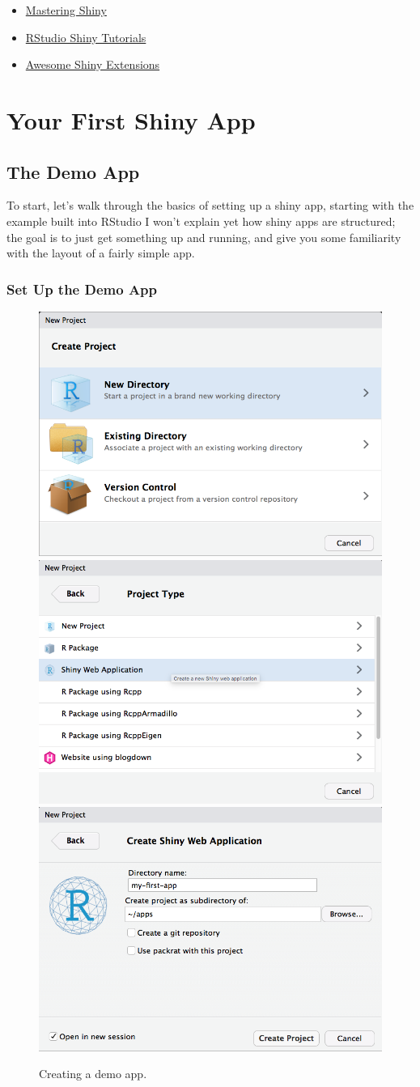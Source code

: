 \documentclass[
]{book}
\providecommand{\tightlist}{%
  \setlength{\itemsep}{0pt}\setlength{\parskip}{0pt}}
\begin{document}
\begin{itemize}
\tightlist
\item
  \href{https://mastering-shiny.org/}{Mastering Shiny}
\item
  \href{https://shiny.rstudio.com/tutorial/}{RStudio Shiny Tutorials}
\item
  \href{https://github.com/nanxstats/awesome-shiny-extensions}{Awesome Shiny Extensions}
\end{itemize}

\hypertarget{first-app}{%
\chapter{Your First Shiny App}\label{first-app}}

\hypertarget{the-demo-app}{%
\section{The Demo App}\label{the-demo-app}}

To start, let's walk through the basics of setting up a shiny app, starting with the example built into RStudio I won't explain yet how shiny apps are structured; the goal is to just get something up and running, and give you some familiarity with the layout of a fairly simple app.

\hypertarget{set-up-the-demo-app}{%
\subsection{Set Up the Demo App}\label{set-up-the-demo-app}}

\begin{figure}

{\centering \includegraphics[width=0.3\linewidth]{images/demo_app/01-create-project} \includegraphics[width=0.3\linewidth]{images/demo_app/02-project-type} \includegraphics[width=0.3\linewidth]{images/demo_app/03-project-directory} 

}

\caption{Creating a demo app.}\label{fig:first-demo}
\end{figure}
\end{document}
